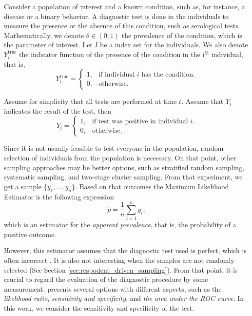 Consider a population of interest and a known condition, such as, for instance,
a disease or a binary behavior. A diagnostic test is done in the individuals
to measure the presence or the absence of this condition, such as serological
tests. Mathematically, we denote
$\theta \in (0,1)$ the prevalence of the condition, which is the parameter of
interest. Let $I$ be a index set for the individuals. We also denote $Y^{\mathrm{true}}_i$ the indicator function of the presence of the
condition in the i$^{th}$ individual, that is, 
$$Y^{\mathrm{true}}_i = \begin{cases}
  1, &\text{if individual } i \text{ has the condition.} \\
  0, &\text{otherwise.}
\end{cases}$$

Assume for simplicity that all tests are performed at time $t$. Assume that
$Y_i$ indicates the result of the test, then 
$$Y_i = \begin{cases}
  1, &\text{if test was positive in individual } i. \\
  0, &\text{otherwise.}
\end{cases}$$

Since it is not usually feasible to test everyone in the population, random
selection of individuals from the population is necessary. On that point,
other sampling approaches may be better options, such as stratified random
sampling, systematic sampling, and two-stage cluster sampling. From that
experiment, we get a sample $\{y_1, ..., y_n\}$. Based on that outcomes the Maximum Likelihood Estimator is the following expression 
\begin{equation}
    \label{eq:naive-estimator}
    \hat{p} = \frac{1}{n}\sum_{i=1}^n y_i, 
\end{equation}
which is an estimator for the {\em apparent prevalence}, that is, the
probability of a positive outcome. 

However, this estimator assumes that the diagnostic test used is perfect,
which is often incorrect . It is also not
interesting when the samples are not randomly selected (See Section
\ref{sec:respodent_driven_sampling}). From that point, it is crucial to regard
the evaluation of the diagnostic procedure by some measurement. \textcite[p.
2]{vsimundic2009measures} presents several options with different aspects,
such as the {\em likelihood ratio}, {\em sensitivity and specificity}, and
{\em the area under the ROC curve}. In this work, we consider the sensitivity
and specificity of the test. 

